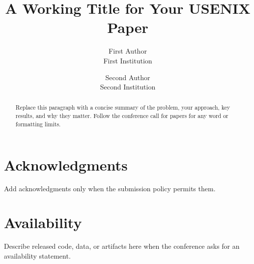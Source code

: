 \documentclass[letterpaper,twocolumn,10pt]{article}
\newif\ifanonymous
\begin{document}
\date{}

\title{A Working Title for Your USENIX Paper}

\ifanonymous
  \author{\rm Anonymous Submission}
\else
  \author{
    {\rm First Author}\\
    First Institution
    \and
    {\rm Second Author}\\
    Second Institution
  }
\fi

\maketitle

\begin{abstract}
Replace this paragraph with a concise summary of the problem, your approach,
key results, and why they matter. Follow the conference call for papers for
any word or formatting limits.
\end{abstract}







\ifanonymous
\else
  \section*{Acknowledgments}
  Add acknowledgments only when the submission policy permits them.

  \section*{Availability}
  Describe released code, data, or artifacts here when the conference asks for
  an availability statement.
\fi


\end{document}
